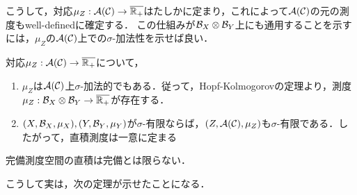\documentclass[uplatex, dvipdfmx]{jsreport}
\begin{document}
\begin{remarks}
    こうして，対応$\mu_Z:\mathcal{A}(\mathcal{C})\to\overline{\mathbb{R}_+}$はたしかに定まり，これによって$\mathcal{A}(\mathcal{C})$の元の測度もwell-definedに確定する．
    この仕組みが$\mathcal{B}_X\otimes\mathcal{B}_Y$上にも通用することを示すには，$\mu_Z$の$\mathcal{A}(\mathcal{C})$上での$\sigma$-加法性を示せば良い．
\end{remarks}

\begin{lemma}[直積測度の存在と一意性]
    対応$\mu_Z:\mathcal{A}(\mathcal{C})\to\overline{\mathbb{R}_+}$について，
    \begin{enumerate}
        \item $\mu_Z$は$\mathcal{A}(\mathcal{C})$上$\sigma$-加法的でもある．従って，Hopf-Kolmogorovの定理より，測度$\mu_Z:\mathcal{B}_X\otimes\mathcal{B}_Y\to\overline{\mathbb{R}_+}$が存在する．
        \item $(X,\mathcal{B}_X,\mu_X),(Y,\mathcal{B}_Y,\mu_Y)$が$\sigma$-有限ならば，$(Z,\mathcal{A}(\mathcal{C}),\mu_Z)$も$\sigma$-有限である．したがって，直積測度は一意に定まる
    \end{enumerate}
\end{lemma}
\begin{remark}
    完備測度空間の直積は完備とは限らない．
\end{remark}

こうして実は，次の定理が示せたことになる．
\end{document}
